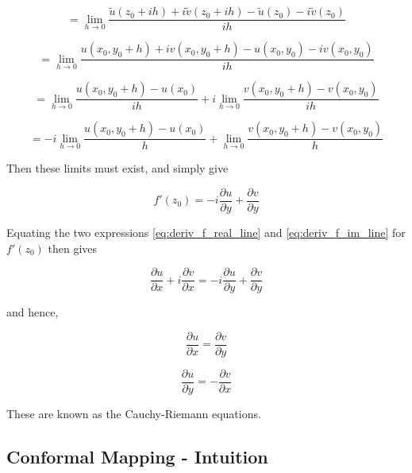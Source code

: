 \documentclass{article}
\begin{document}
\begin{equation}
= \lim_{h \to 0}\frac{\tilde{u}(z_0 + ih) + i\tilde{v}(z_0 + ih) - \tilde{u}(z_0) - i\tilde{v}(z_0)}{ih}
\end{equation}


\begin{equation}
= \lim_{h \to 0}\frac{u(x_0, y_0 + h) + iv(x_0, y_0 + h) - u(x_0, y_0) - iv(x_0, y_0)}{ih}
\end{equation}


\begin{equation}
= \lim_{h \to 0}\frac{u(x_0, y_0+h) - u(x_0)}{ih} + i\lim_{h \to 0}\frac{v(x_0, y_0+h)-v(x_0, y_0)}{ih}
\end{equation}


\begin{equation}
= -i\lim_{h \to 0}\frac{u(x_0, y_0+h) - u(x_0)}{h} + \lim_{h \to 0}\frac{v(x_0, y_0+h)-v(x_0, y_0)}{h}
\end{equation}


Then these limits must exist, and simply give

\begin{equation}
\label{eq:deriv_f_im_line}
f'(z_0) = -i\frac{\partial u}{\partial y} + \frac{\partial v}{\partial y}
\end{equation}

Equating the two expressions \eqref{eq:deriv_f_real_line} and \eqref{eq:deriv_f_im_line} for $f'(z_0)$ then gives

\begin{equation}
\frac{\partial u}{\partial x} + i\frac{\partial v}{\partial x} = -i\frac{\partial u}{\partial y} + \frac{\partial v}{\partial y}
\end{equation}

and hence,

\begin{equation}
\frac{\partial u}{\partial x} = \frac{\partial v}{\partial y}
\end{equation}

\begin{equation}
\frac{\partial u}{\partial y} = -\frac{\partial v}{\partial x}
\end{equation}

These are known as the Cauchy-Riemann equations. %


\subsection{Conformal Mapping - Intuition}
\end{document}
